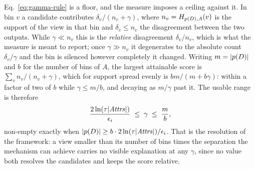 \begin{remark}
\label{rem:gamma-window}
Eq.~\eqref{eq:gamma-rule} is a floor, and the measure imposes a ceiling against it.
In bin $v$ a candidate contributes $\delta_v/(n_v+\gamma)$, where $n_v=H_{p(D),A}(v)$ is the support of the view in that bin and $\delta_v\le n_v$ the disagreement between the two outputs.
While $\gamma\ll n_v$ this is the \emph{relative} disagreement $\delta_v/n_v$, which is what the measure is meant to report; once $\gamma\gg n_v$ it degenerates to the absolute count $\delta_v/\gamma$ and the bin is silenced however completely it changed.
Writing $m=|p(D)|$ and $b$ for the number of bins of $A$, the largest attainable score is $\sum_v n_v/(n_v+\gamma)$, which for support spread evenly is $bm/(m+b\gamma)$: within a factor of two of $b$ while $\gamma\le m/b$, and decaying as $m/\gamma$ past it.
The usable range is therefore
\begin{equation}
\frac{2\ln(\tau|\mathit{Attrs}|)}{\epsilon_i}\;\le\;\gamma\;\le\;\frac{m}{b},
\label{eq:gamma-window}
\end{equation}
non-empty exactly when $|p(D)|\ge b\cdot2\ln(\tau|\mathit{Attrs}|)/\epsilon_i$.
That is the resolution of the framework: a view smaller than its number of bins times the separation the mechanism can achieve carries no visible explanation at any $\gamma$, since no value both resolves the candidates and keeps the score relative.
\end{remark}

